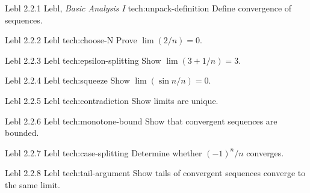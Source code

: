 \seqex
{Lebl 2.2.1}
{Lebl, \textit{Basic Analysis I}}
{tech:unpack-definition}
{Define convergence of sequences.}

\seqex
{Lebl 2.2.2}
{Lebl}
{tech:choose-N}
{Prove $\lim (2/n)=0$.}

\seqex
{Lebl 2.2.3}
{Lebl}
{tech:epsilon-splitting}
{Show $\lim (3+1/n)=3$.}

\seqex
{Lebl 2.2.4}
{Lebl}
{tech:squeeze}
{Show $\lim (\sin n/n)=0$.}

\seqex
{Lebl 2.2.5}
{Lebl}
{tech:contradiction}
{Show limits are unique.}

\seqex
{Lebl 2.2.6}
{Lebl}
{tech:monotone-bound}
{Show that convergent sequences are bounded.}

\seqex
{Lebl 2.2.7}
{Lebl}
{tech:case-splitting}
{Determine whether $(-1)^n/n$ converges.}

\seqex
{Lebl 2.2.8}
{Lebl}
{tech:tail-argument}
{Show tails of convergent sequences converge to the same limit.}
